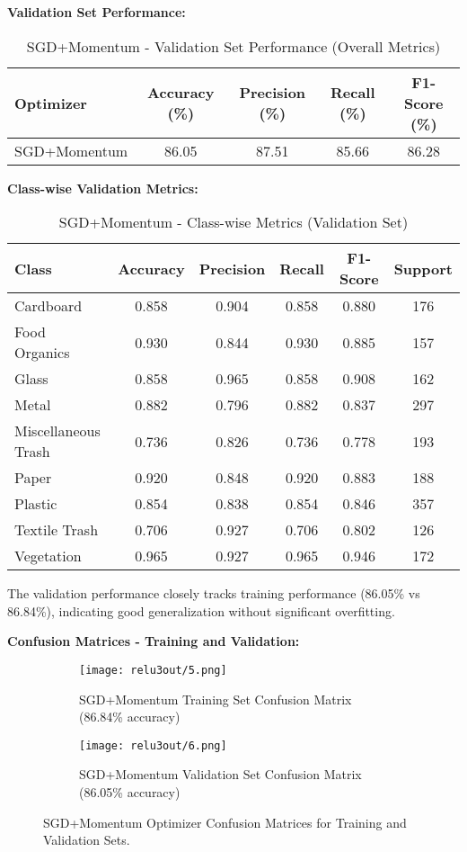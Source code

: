 \documentclass[12pt,a4paper]{article}
\begin{document}
\textbf{Validation Set Performance:}

\begin{table}[H]
\centering
\caption{SGD+Momentum - Validation Set Performance (Overall Metrics)}
\begin{tabular}{lcccc}
\toprule
\textbf{Optimizer} & \textbf{Accuracy (\%)} & \textbf{Precision (\%)} & \textbf{Recall (\%)} & \textbf{F1-Score (\%)} \\
\midrule
SGD+Momentum & 86.05 & 87.51 & 85.66 & 86.28 \\
\bottomrule
\end{tabular}
\end{table}

\textbf{Class-wise Validation Metrics:}

\begin{table}[H]
\centering
\caption{SGD+Momentum - Class-wise Metrics (Validation Set)}
\begin{tabular}{lccccc}
\toprule
\textbf{Class} & \textbf{Accuracy} & \textbf{Precision} & \textbf{Recall} & \textbf{F1-Score} & \textbf{Support} \\
\midrule
Cardboard & 0.858 & 0.904 & 0.858 & 0.880 & 176 \\
Food Organics & 0.930 & 0.844 & 0.930 & 0.885 & 157 \\
Glass & 0.858 & 0.965 & 0.858 & 0.908 & 162 \\
Metal & 0.882 & 0.796 & 0.882 & 0.837 & 297 \\
Miscellaneous Trash & 0.736 & 0.826 & 0.736 & 0.778 & 193 \\
Paper & 0.920 & 0.848 & 0.920 & 0.883 & 188 \\
Plastic & 0.854 & 0.838 & 0.854 & 0.846 & 357 \\
Textile Trash & 0.706 & 0.927 & 0.706 & 0.802 & 126 \\
Vegetation & 0.965 & 0.927 & 0.965 & 0.946 & 172 \\
\bottomrule
\end{tabular}
\end{table}

The validation performance closely tracks training performance (86.05\% vs 86.84\%), indicating good generalization without significant overfitting.

\textbf{Confusion Matrices - Training and Validation:}

\begin{figure}[H]
\centering
\begin{subfigure}[b]{0.48\textwidth}
    \centering
    \texttt{[image: relu3out/5.png]}
    \caption{SGD+Momentum Training Set Confusion Matrix (86.84\% accuracy)}
    \label{fig:sgdmomentum_confmat_train}
\end{subfigure}
\hfill
\begin{subfigure}[b]{0.48\textwidth}
    \centering
    \texttt{[image: relu3out/6.png]}
    \caption{SGD+Momentum Validation Set Confusion Matrix (86.05\% accuracy)}
    \label{fig:sgdmomentum_confmat_val}
\end{subfigure}
\caption{SGD+Momentum Optimizer Confusion Matrices for Training and Validation Sets.}
\label{fig:sgdmomentum_confmat_comparison}
\end{figure}
\end{document}
